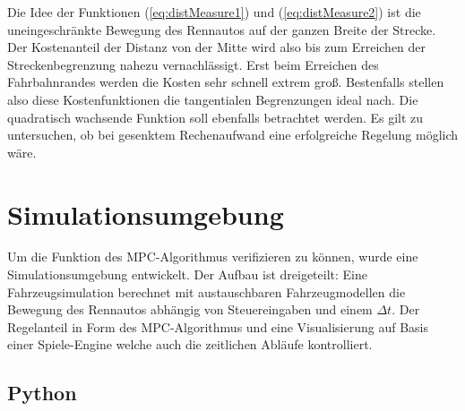 \documentclass{like}
\begin{document}
Die Idee der Funktionen (\ref{eq:distMeasure1}) und (\ref{eq:distMeasure2}) ist die uneingeschränkte Bewegung des Rennautos auf der ganzen Breite der Strecke. Der Kostenanteil der Distanz von der Mitte wird also bis zum Erreichen der Streckenbegrenzung nahezu vernachlässigt. Erst beim Erreichen des Fahrbahnrandes werden die Kosten sehr schnell extrem groß. Bestenfalls stellen also diese Kostenfunktionen die tangentialen Begrenzungen ideal nach. Die qua\-dra\-tisch wachsende Funktion soll ebenfalls betrachtet werden. Es gilt zu untersuchen, ob bei gesenktem Rechenaufwand eine erfolgreiche Regelung möglich wäre.

\chapter{Simulationsumgebung}
Um die Funktion des \ac{MPC}-Algorithmus verifizieren zu können, wurde eine Si\-mu\-lations\-um\-ge\-bung entwickelt. Der Aufbau ist dreigeteilt: Eine Fahrzeugsimulation berechnet mit austauschbaren Fahrzeugmodellen die Bewegung des Rennautos abhängig von Steuer\-ein\-ga\-ben und einem $\Delta t$. Der Regelanteil in Form des \ac{MPC}-Algorithmus und eine Visualisierung auf Basis einer Spiele-Engine welche auch die zeitlichen Abläufe kontrolliert. 

\section{Python}
\end{document}
